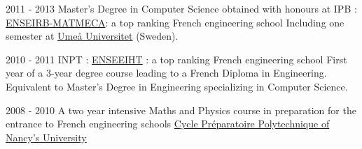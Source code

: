 \cventry
{2011 - 2013}
{Master's Degree in Computer Science}
{obtained with honours at IPB : \href{https://enseirb-matmeca.bordeaux-inp.fr/fr}{ENSEIRB-MATMECA}: a top ranking French engineering school}
{}
{}
{	
	Including one semester at \href{http://www.umu.se}{Ume\aa{} Universitet} (Sweden).
}


\cventry
{2010 - 2011}
{INPT : \href{http://www.enseeiht.fr}{ENSEEIHT} : a top ranking French engineering school}
{}
{}
{}
{
	First year of a 3-year degree course leading to a French Diploma in Engineering.\newline
	Equivalent to Master's Degree in Engineering specializing in Computer Science.
}

\cventry
{2008 - 2010}
{A two year intensive Maths and Physics course in preparation for the entrance
to French engineering schools}
{\href{http://www.la-prepa-des-inp.fr}{Cycle Préparatoire Polytechnique of Nancy’s University}}
{}
{}
{}


